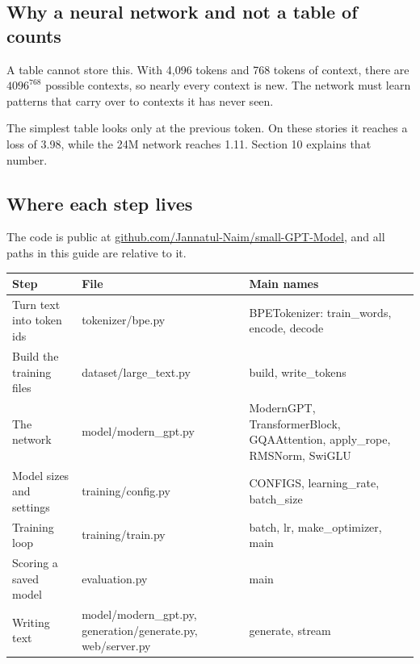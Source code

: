 \documentclass[11pt,a4paper]{article}
\begin{document}
\subsection*{Why a neural network and not a table of counts}
{}

A table cannot store this. With 4,096 tokens and 768 tokens of context, there are $4096^{768}$ possible contexts, so nearly every context is new. The network must learn patterns that carry over to contexts it has never seen.

The simplest table looks only at the previous token. On these stories it reaches a loss of 3.98, while the 24M network reaches 1.11. Section 10 explains that number.

\subsection*{Where each step lives}
{}

The code is public at \href{https://github.com/Jannatul-Naim/small-GPT-Model}{github.com/Jannatul-Naim/small-GPT-Model}, and all paths in this guide are relative to it.

{\small
\begin{longtable}{@{}>{\raggedright\arraybackslash}p{}>{\raggedright\arraybackslash}p{}>{\raggedright\arraybackslash}p{}@{}}
\toprule
\textbf{Step} & \textbf{File} & \textbf{Main names} \\
\midrule
\endhead
Turn text into token ids & tokenizer/bpe.py & BPETokenizer: train\_words, encode, decode \\
Build the training files & dataset/large\_text.py & build, write\_tokens \\
The network & model/modern\_gpt.py & ModernGPT, TransformerBlock, GQAAttention, apply\_rope, RMSNorm, SwiGLU \\
Model sizes and settings & training/config.py & CONFIGS, learning\_rate, batch\_size \\
Training loop & training/train.py & batch, lr, make\_optimizer, main \\
Scoring a saved model & evaluation.py & main \\
Writing text & model/modern\_gpt.py, generation/generate.py, web/server.py & generate, stream \\
\bottomrule
\end{longtable}
}
\end{document}
